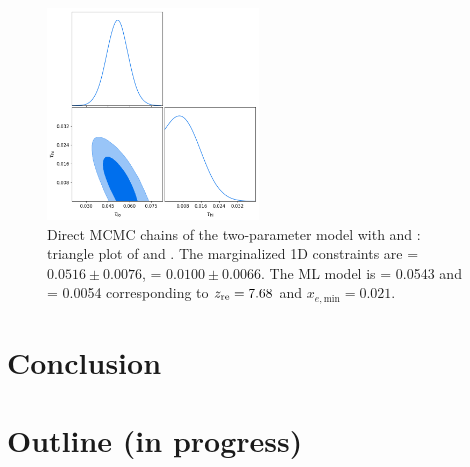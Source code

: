 \documentclass[prd,twocolumn,amsmath,amssymb,floatfix,superscriptaddress,nofootinbib]{revtex4-1}
\begin{document}
\begin{figure}
\includegraphics[width=0.5\textwidth]{results/direct_mcmc/two_parameter_model/tauhi_taulo_chains/pl18_tanh_highz_test2_run1_tri.png}
\caption{Direct MCMC chains of the two-parameter model with \tauhi and \taulo: triangle plot of \tauhi and \taulo. The marginalized 1D constraints are \taulo = $0.0516 \pm 0.0076$, \tauhi = $0.0100 \pm   0.0066$. The ML model is \taulo = 0.0543 and \tauhi = 0.0054 corresponding to $z_{\rm re} = 7.68$ and $x_{e, \mathrm{min}} = 0.021$.
}
\label{fig:two_parameter_model_2D_plot}
\end{figure}


\section{Conclusion}
\label{sec:conclusion}




\appendix

\section{Outline (in progress)}
\end{document}
